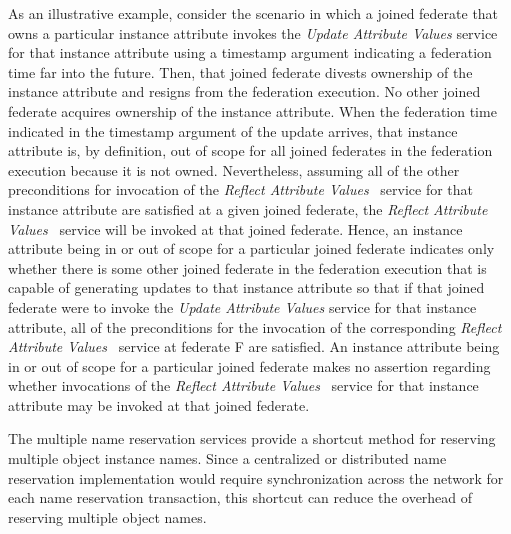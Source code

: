 \begin{annexstdpage}
    As an illustrative example, consider the scenario in which a joined federate that owns a particular instance attribute invokes the \textit{Update Attribute Values} service for that instance attribute using a timestamp argument indicating a federation time far into the future. Then, that joined federate divests ownership of the instance attribute and resigns from the federation execution. No other joined federate acquires ownership of the instance attribute. When the federation time indicated in the timestamp argument of the update arrives, that instance attribute is, by definition, out of scope for all joined federates in the federation execution because it is not owned. Nevertheless, assuming all of the other preconditions for invocation of the \textit{Reflect Attribute Values} \rtiinitiated\ service for that instance attribute are satisfied at a given joined federate, the \textit{Reflect Attribute Values} \rtiinitiated\ service will be invoked at that joined federate. Hence, an instance attribute being in or out of scope for a particular joined federate indicates only whether there is some other joined federate in the federation execution that is capable of generating updates to that instance attribute so that if that joined federate were to invoke the \textit{Update Attribute Values} service for that instance attribute, all of the preconditions for the invocation of the corresponding \textit{Reflect Attribute Values} \rtiinitiated\ service at federate F are satisfied. An instance attribute being in or out of scope for a particular joined federate makes no assertion regarding whether invocations of the \textit{Reflect Attribute Values} \rtiinitiated\ service for that instance attribute may be invoked at that joined federate.


    The multiple name reservation services provide a shortcut method for reserving multiple object instance names. Since a centralized or distributed name reservation implementation would require synchronization across the network for each name reservation transaction, this shortcut can reduce the overhead of reserving multiple object names.



\end{annexstdpage}
